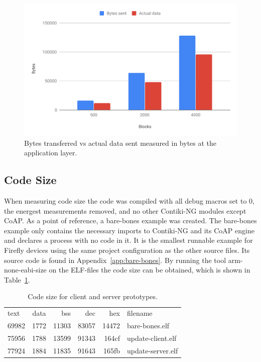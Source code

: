 \documentclass[0-thesis.tex]{subfiles}
\begin{document}
\begin{figure}[h!]
    \caption{Bytes transferred vs actual data sent measured in bytes at the application layer.}
    \label{fig:communication-overhead}
    \includegraphics[scale=0.65]{images/communication-overhead.pdf}
\end{figure}

\subsection{Code Size}
\label{ssec:code-size}
When measuring code size the code was compiled with all debug macros set to 0, the
energest measurements removed, and no other Contiki-NG modules except CoAP. As a point of
reference, a bare-bones example was created. The bare-bones example only contains the
necessary imports to Contiki-NG and its CoAP engine and declares a process with no code in
it. It is the smallest runnable example for Firefly devices using the same project
configuration as the other source files. Its source code is found in
Appendix~\ref{app:bare-bones}. By running the tool arm-none-eabi-size on the ELF-files the
code size can be obtained, which is shown in Table~\ref{tab:code-size}.

\begin{table}[h!]
\begin{tabular}{l c r r r l}
text	&  data	 &  bss	 &  dec	 &  hex&filename\\
69982	&  1772	 &11303	 &83057	 &14472&bare-bones.elf\\
75956	&  1788	 &13599	 &91343	 &164cf&update-client.elf\\
77924	&  1884	 &11835	 &91643	 &165fb&update-server.elf
\end{tabular}
\caption{Code size for client and server prototypes.}
\label{tab:code-size}
\end{table}
\end{document}
